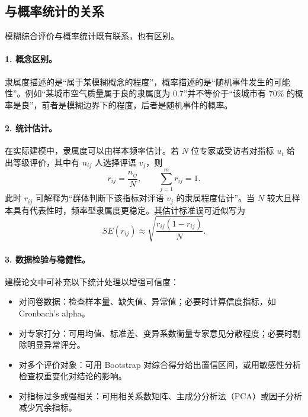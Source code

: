 \documentclass[UTF8,zihao=-4,fontset=none]{ctexart}
\begin{document}
\subsection{与概率统计的关系}
模糊综合评价与概率统计既有联系，也有区别。

\paragraph{1. 概念区别。} 隶属度描述的是“属于某模糊概念的程度”，概率描述的是“随机事件发生的可能性”。例如“某城市空气质量属于良的隶属度为 0.7”并不等价于“该城市有 70\% 的概率是良”，前者是模糊边界下的程度，后者是随机事件的概率。

\paragraph{2. 统计估计。} 在实际建模中，隶属度可以由样本频率估计。若 $N$ 位专家或受访者对指标 $u_i$ 给出等级评价，其中有 $n_{ij}$ 人选择评语 $v_j$，则
\begin{equation}
  r_{ij}=\frac{n_{ij}}{N}, \qquad \sum_{j=1}^m r_{ij}=1.
\end{equation}
此时 $r_{ij}$ 可解释为“群体判断下该指标对评语 $v_j$ 的隶属程度估计”。当 $N$ 较大且样本具有代表性时，频率型隶属度更稳定。其估计标准误可近似写为
\begin{equation}
  SE(r_{ij})\approx \sqrt{\frac{r_{ij}(1-r_{ij})}{N}}.
\end{equation}

\paragraph{3. 数据检验与稳健性。} 建模论文中可补充以下统计处理以增强可信度：
\begin{itemize}[leftmargin=2.2em]
  \item 对问卷数据：检查样本量、缺失值、异常值；必要时计算信度指标，如 Cronbach's alpha。
  \item 对专家打分：可用均值、标准差、变异系数衡量专家意见分散程度；必要时剔除明显异常评分。
  \item 对多个评价对象：可用 Bootstrap 对综合得分给出置信区间，或用敏感性分析检查权重变化对结论的影响。
  \item 对指标过多或强相关：可用相关系数矩阵、主成分分析法（PCA）或因子分析减少冗余指标。
\end{itemize}
\end{document}
